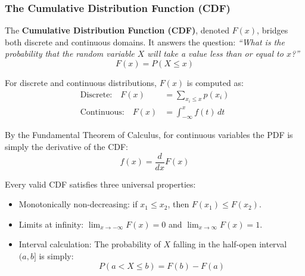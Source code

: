 \subsubsection{The Cumulative Distribution Function (CDF)}
The \textbf{Cumulative Distribution Function (CDF)}, denoted $F(x)$, bridges both discrete and continuous domains. It answers the question: \textit{``What is the probability that the random variable $X$ will take a value less than or equal to $x$?''}
\begin{equation}
F(x) = P(X \le x)\label{eq:cdf_definition}
\end{equation}

For discrete and continuous distributions, $F(x)$ is computed as:
\begin{align}
\text{Discrete:}\quad F(x) &= \sum_{x_i \le x} p(x_i) \\
\text{Continuous:}\quad F(x) &= \int_{-\infty}^{x} f(t)\,dt
\end{align}

By the Fundamental Theorem of Calculus, for continuous variables the PDF is simply the derivative of the CDF:
\begin{equation}
f(x) = \frac{d}{dx}F(x)
\end{equation}

Every valid CDF satisfies three universal properties:
\begin{itemize}
    \item Monotonically non-decreasing: if $x_1 \le x_2$, then $F(x_1) \le F(x_2)$.
    \item Limits at infinity: $\lim_{x \to -\infty} F(x) = 0$ and $\lim_{x \to \infty} F(x) = 1$.
    \item Interval calculation: The probability of $X$ falling in the half-open interval $(a, b]$ is simply:
    \begin{equation}
    P(a < X \le b) = F(b) - F(a)
    \end{equation}
\end{itemize}

